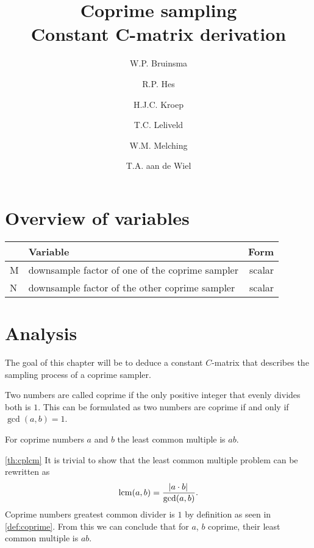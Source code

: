\documentclass[a4paper, openany, oneside]{memoir}
\title{Coprime sampling\\Constant C-matrix derivation}
\author{W.P. Bruinsma \and R.P. Hes \and H.J.C. Kroep \and T.C. Leliveld \and W.M. Melching \and T.A. aan de Wiel}
\begin{document}
\begin{titlingpage}
  \pagestyle{empty}
  \maketitle
\end{titlingpage}
\chapter{Overview of variables}
\begin{center}
    \begin{tabular}{llr}
        \toprule
         & Variable & Form \\
        \midrule
        M & downsample factor of one of the coprime sampler & scalar \\
        N & downsample factor of the other coprime sampler & scalar \\
        \bottomrule
    \end{tabular}
\end{center}

\chapter{Analysis}
The goal of this chapter will be to deduce a constant $C$-matrix that describes the sampling process of a coprime sampler.

\begin{blockDefinition}
\label{def:coprime}
    Two numbers are called coprime if the only positive integer that evenly divides both is $1$. This can be formulated as two numbers are coprime if and only if $\gcd(a,b) = 1$.
\end{blockDefinition}

\begin{blockTheorem}\label{th:cplcm}
    For coprime numbers $a$ and $b$ the least common multiple is $ab$.
\end{blockTheorem}

\begin{blockProofTheorem}{\ref{th:cplcm}}
    It is trivial to show that the least common multiple problem can be rewritten as \begin{equation*}
        \operatorname{lcm}(a,b) = \frac{\abs{a \cdot b}}{\gcd(a,b)}.
    \end{equation*}
    Coprime numbers greatest common divider is $1$ by definition as seen in \cref{def:coprime}. From this we can conclude that for $a$, $b$ coprime, their least common multiple is $ab$.
\end{blockProofTheorem}
\end{document}
